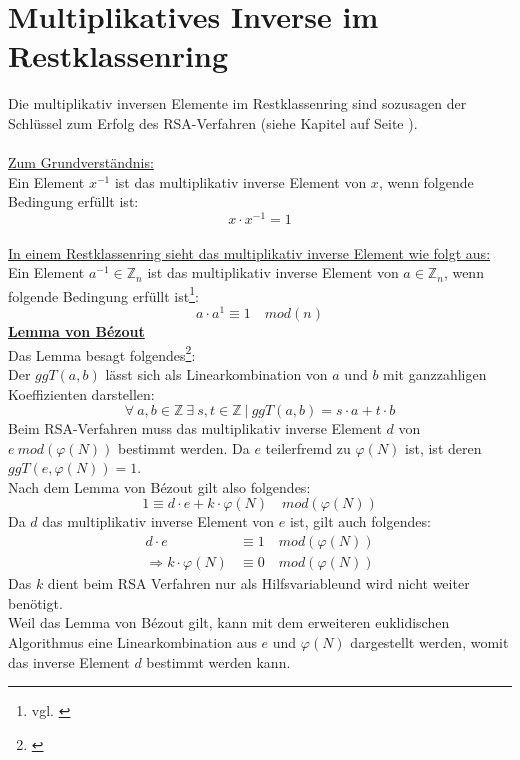 \section{Multiplikatives Inverse im Restklassenring}
\label{sec:Inverse_Restklassenring}
Die multiplikativ inversen Elemente im Restklassenring sind sozusagen der Schlüssel zum Erfolg des RSA-Verfahren (siehe Kapitel \textit{} auf Seite \pageref{sec:Beweis}).\\
\\
\underline{Zum Grundverständnis:}\\
Ein Element $x^{-1}$ ist das multiplikativ inverse Element von $x$, wenn folgende Bedingung erfüllt ist:
\begin{equation*}
 x \cdot x^{-1}=1
\end{equation*}\\
\underline{In einem Restklassenring sieht das multiplikativ inverse Element wie folgt aus:}\\
Ein Element $a^{-1} \in \mathbb{Z}_n$ ist das multiplikativ inverse Element von $a \in \mathbb{Z}_n$, wenn folgende Bedingung erfüllt ist\footnote{vgl. \cite{inverse}}:
\begin{equation*}
a \cdot a^{1} \equiv 1 \quad mod(n)
\end{equation*}
\underline{\textbf{Lemma von Bézout}}\\
Das Lemma besagt folgendes\footnote{ \cite{bezout}}:\\
Der $ggT(a,b)$ lässt sich als Linearkombination von $a$ und $b$ mit ganzzahligen Koeffizienten darstellen:
\begin{equation*}
\forall~a,b \in \mathbb{Z}~\exists~s,t \in \mathbb{Z}~|~ggT(a,b)=s\cdot a+t\cdot b
\end{equation*}
Beim RSA-Verfahren muss das multiplikativ inverse Element $d$ von $e~mod(\varphi(N))$ bestimmt werden. Da $e$ teilerfremd zu $\varphi(N)$ ist, ist deren $ggT(e,\varphi(N))=1$.\\
Nach dem Lemma von Bézout gilt also folgendes:
\begin{equation*}
1\equiv d \cdot e + k \cdot \varphi(N) \quad mod(\varphi(N))
\end{equation*}
Da $d$ das multiplikativ inverse Element von $e$ ist, gilt auch folgendes:
\begin{align*}
d\cdot e &\equiv 1 \quad mod(\varphi(N))\\
\Rightarrow k \cdot \varphi(N) &\equiv 0 \quad mod(\varphi(N))
\end{align*}
Das $k$ dient beim RSA Verfahren nur als \glqq Hilfsvariable\grqq und wird nicht weiter benötigt.\\
Weil das Lemma von Bézout gilt, kann mit dem erweiteren euklidischen Algorithmus eine Linearkombination aus $e$ und $\varphi(N)$ dargestellt werden, womit das inverse Element $d$ bestimmt werden kann.
